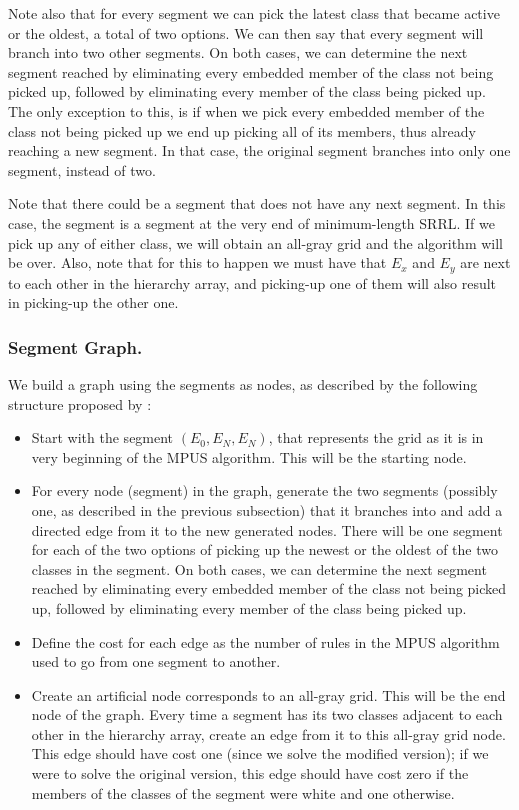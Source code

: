  Note also that for every segment we can pick the latest class that became active or the oldest, a total of two options. We can then say that every segment will branch into two other segments. On both cases, we can determine the next segment reached by eliminating every embedded member of the class not being picked up, followed by eliminating every member of the class being picked up. The only exception to this, is if when we pick every embedded member of the class not being picked up we end up picking all of its members, thus already reaching a new segment. In that case, the original segment branches into only one segment, instead of two.

Note that there could be a segment that does not have any next segment. In this case, the segment is a segment at the very end of minimum-length SRRL. If we pick up any of either class, we will obtain an all-gray grid and the algorithm will be over. Also, note that for this to happen we must have that $E_{x}$ and $E_{y}$ are next to each other in the hierarchy array, and picking-up one of them will also result in picking-up the other one.

\subsubsection{Segment Graph.}

We build a graph using the segments as nodes, as described by the following structure proposed by \cite{ACJKLW07}:

\begin{itemize}

\item Start with the segment $(E_{0}, E_{N}, E_{N})$, that represents the grid as it is in very beginning of the MPUS algorithm. This will be the starting node.

\item For every node (segment) in the graph, generate the two segments (possibly one, as described in the previous subsection) that it branches into and add a directed edge from it to the new generated nodes.
 There will be one segment for each of the two options of picking up the newest or the oldest of the two classes in the segment. On both cases, we can determine the next segment reached by eliminating every embedded member of the class not being picked up, followed by eliminating every member of the class being picked up.

\item Define the cost for each edge as the number of rules in the MPUS algorithm used to go from one segment to another.

\item Create an artificial node corresponds to an all-gray grid. This will be the end node of the graph. Every time a segment has its two classes adjacent to each other in the hierarchy array, create an edge from it to this all-gray grid node.
 This edge should have cost one (since we solve the modified version);
if we were to solve the original version, this edge should have cost zero
if the members of the classes of the segment were white and one otherwise.

\end{itemize}


